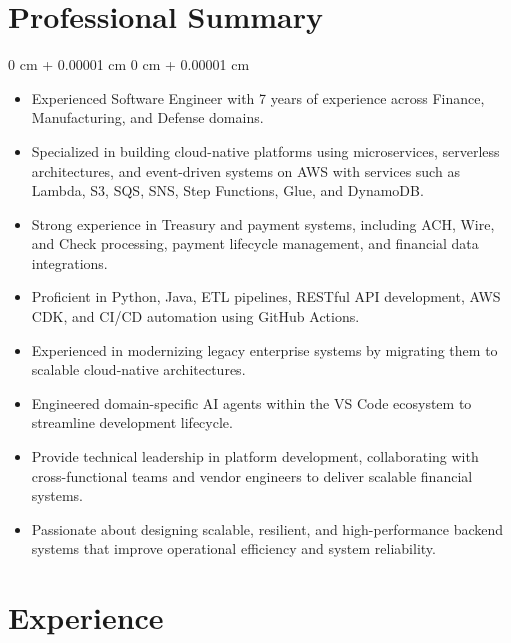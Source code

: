 \documentclass[10pt, letterpaper]{article}
\newenvironment{highlights}{
    \begin{itemize}[
        topsep=0.10 cm,
        parsep=0.10 cm,
        partopsep=0pt,
        itemsep=0pt,
        leftmargin=0 cm + 10pt
    ]
}{
    \end{itemize}
} %
\newenvironment{onecolentry}{
    \begin{adjustwidth}{
        0 cm + 0.00001 cm
    }{
        0 cm + 0.00001 cm
    }
}{
    \end{adjustwidth}
} %
\begin{document}
    \section{Professional Summary}
        \vspace{0.20 cm}
        \begin{onecolentry}
            \begin{highlights}
	\item Experienced Software Engineer with 7 years of experience across Finance, Manufacturing, and Defense domains.

\item Specialized in building cloud-native platforms using microservices, serverless architectures, and event-driven systems on AWS with services such as Lambda, S3, SQS, SNS, Step Functions, Glue, and DynamoDB.

\item Strong experience in Treasury and payment systems, including ACH, Wire, and Check processing, payment lifecycle management, and financial data integrations.

\item Proficient in Python, Java, ETL pipelines, RESTful API development, AWS CDK, and CI/CD automation using GitHub Actions.

\item Experienced in modernizing legacy enterprise systems by migrating them to scalable cloud-native architectures.

\item Engineered domain-specific AI agents within the VS Code ecosystem to streamline development lifecycle.

\item Provide technical leadership in platform development, collaborating with cross-functional teams and vendor engineers to deliver scalable financial systems.

\item Passionate about designing scalable, resilient, and high-performance backend systems that improve operational efficiency and system reliability.
            \end{highlights}
        \end{onecolentry}
        \vspace{0.1 cm}
    \section{Experience}
                \vspace{0.2 cm}
\end{document}
